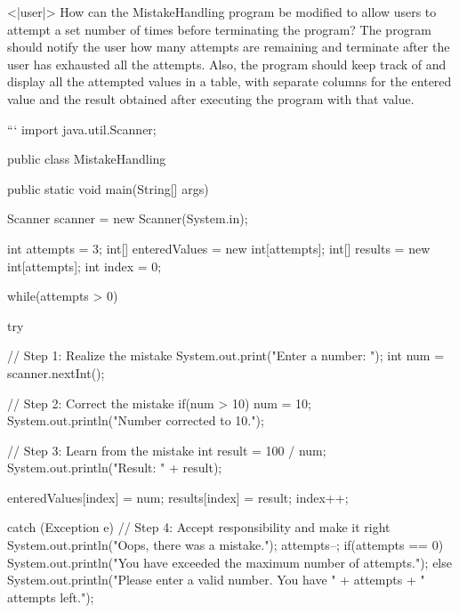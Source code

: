 \documentclass{article}
\begin{document}
\begin{tcolorbox}[colframe=black,colback=white]
<|user|>
How can the MistakeHandling program be modified to allow users to attempt a set number of times before terminating the program? The program should notify the user how many attempts are remaining and terminate after the user has exhausted all the attempts. Also, the program should keep track of and display all the attempted values in a table, with separate columns for the entered value and the result obtained after executing the program with that value.  

```
import java.util.Scanner;

public class MistakeHandling {
    public static void main(String[] args) {
        Scanner scanner = new Scanner(System.in);

        int attempts = 3;
        int[] enteredValues = new int[attempts];
        int[] results = new int[attempts];
        int index = 0;

        while(attempts > 0) {
            try {
                // Step 1: Realize the mistake
                System.out.print("Enter a number: ");
                int num = scanner.nextInt();

                // Step 2: Correct the mistake
                if(num > 10) {
                    num = 10;
                    System.out.println("Number corrected to 10.");
                }

                // Step 3: Learn from the mistake
                int result = 100 / num;
                System.out.println("Result: " + result);

                enteredValues[index] = num;
                results[index] = result;
                index++;

            } catch (Exception e) {
                // Step 4: Accept responsibility and make it right
                System.out.println("Oops, there was a mistake.");
                attempts--;
                if(attempts == 0) {
                    System.out.println("You have exceeded the maximum number of attempts.");
                } else {
                    System.out.println("Please enter a valid number. You have " + attempts + " attempts left.");
                }
            }
        }

}}
\end{tcolorbox}
\end{document}

